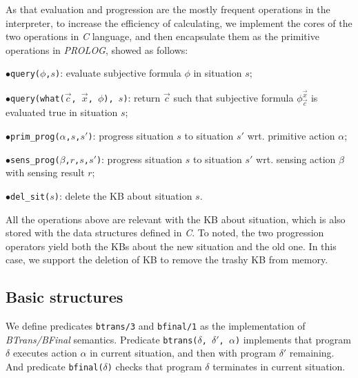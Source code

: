 \documentclass[letterpaper]{article}
\begin{document}
As that evaluation and progression are the mostly frequent operations in the interpreter, to increase the efficiency of calculating, we implement the cores of the two operations in \emph{C} language, and then encapsulate them as the primitive operations in \emph{PROLOG}, showed as follows:

$\bullet$\texttt{query($\phi$,$s$)}: evaluate subjective formula $\phi$ in situation $s$;

$\bullet$\texttt{query(what($\vec{c}$, $\vec{x}$, $\phi$), $s$)}: return $\vec{c}$ such that subjective formula $\phi_{\vec{c}}^{\vec{x}}$ is evaluated true in situation $s$;

$\bullet$\texttt{prim\_prog($\alpha$,$s$,$s'$)}: progress situation $s$ to situation $s'$ wrt. primitive action $\alpha$;

$\bullet$\texttt{sens\_prog($\beta$,$r$,$s$,$s'$)}: progress situation $s$ to situation $s'$ wrt. sensing action $\beta$ with sensing result $r$;

$\bullet$\texttt{del\_sit($s$)}: delete the KB about situation $s$.

All the operations above are relevant with the KB about situation, which is also stored with the data structures defined in \emph{C}. To noted, the two progression operators yield both the KBs about the new situation and the old one. In this case, we support the deletion of KB to remove the trashy KB from memory.

\subsection{Basic structures}

We define predicates \texttt{btrans/3} and \texttt{bfinal/1} as the implementation of \emph{BTrans/BFinal} semantics. Predicate \texttt{btrans($\delta$, $\delta'$, $\alpha$)} implements that program $\delta$ executes action $\alpha$ in current situation, and then with program $\delta'$ remaining. And predicate \texttt{bfinal($\delta$)} checks that program $\delta$ terminates in current situation.
\end{document}
